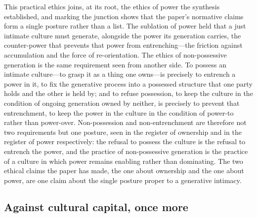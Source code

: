 This practical ethics joins, at its root, the ethics of power the synthesis established, and marking the junction shows that the paper's normative claims form a single posture rather than a list. The sublation of power held that a just intimate culture must generate, alongside the power its generation carries, the counter-power that prevents that power from entrenching---the friction against accumulation and the force of re-orientation. The ethics of non-possessive generation is the same requirement seen from another side. To possess an intimate culture---to grasp it as a thing one owns---is precisely to entrench a power in it, to fix the generative process into a possessed structure that one party holds and the other is held by; and to refuse possession, to keep the culture in the condition of ongoing generation owned by neither, is precisely to prevent that entrenchment, to keep the power in the culture in the condition of power-to rather than power-over. Non-possession and non-entrenchment are therefore not two requirements but one posture, seen in the register of ownership and in the register of power respectively: the refusal to possess the culture is the refusal to entrench the power, and the practice of non-possessive generation is the practice of a culture in which power remains enabling rather than dominating. The two ethical claims the paper has made, the one about ownership and the one about power, are one claim about the single posture proper to a generative intimacy.

\subsection*{Against cultural capital, once more}

